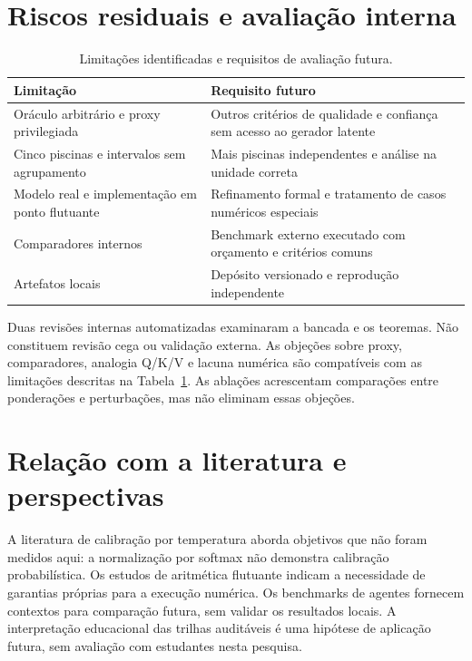 \section{Riscos residuais e avaliação interna}
\begin{table}[htbp]
\fontsize{10}{12}\selectfont\SingleSpacing\centering
\caption{Limitações identificadas e requisitos de avaliação futura.}\label{tab:riscos}
\begin{tabularx}{\textwidth}{XX}\toprule
Limitação & Requisito futuro \\\midrule
Oráculo arbitrário e proxy privilegiada & Outros critérios de qualidade e confiança sem acesso ao gerador latente \\
Cinco piscinas e intervalos sem agrupamento & Mais piscinas independentes e análise na unidade correta \\
Modelo real e implementação em ponto flutuante & Refinamento formal e tratamento de casos numéricos especiais \\
Comparadores internos & Benchmark externo executado com orçamento e critérios comuns \\
Artefatos locais & Depósito versionado e reprodução independente \\
\bottomrule\end{tabularx}
\end{table}
Duas revisões internas automatizadas examinaram a bancada e os teoremas. Não constituem revisão cega ou validação externa. As objeções sobre proxy, comparadores, analogia Q/K/V e lacuna numérica são compatíveis com as limitações descritas na Tabela~\ref{tab:riscos}. As ablações acrescentam comparações entre ponderações e perturbações, mas não eliminam essas objeções.
\section{Relação com a literatura e perspectivas}
A literatura de calibração por temperatura \cite{komisarenko2024,xuan2025,xie2024} aborda objetivos que não foram medidos aqui: a normalização por softmax não demonstra calibração probabilística. Os estudos de aritmética flutuante \cite{bagnara2019,murray2026} indicam a necessidade de garantias próprias para a execução numérica. Os benchmarks de agentes \cite{agentbench2023,perspectivegap2026,orchrm2026,orchestrator2025} fornecem contextos para comparação futura, sem validar os resultados locais. A interpretação educacional das trilhas auditáveis é uma hipótese de aplicação futura, sem avaliação com estudantes nesta pesquisa.
